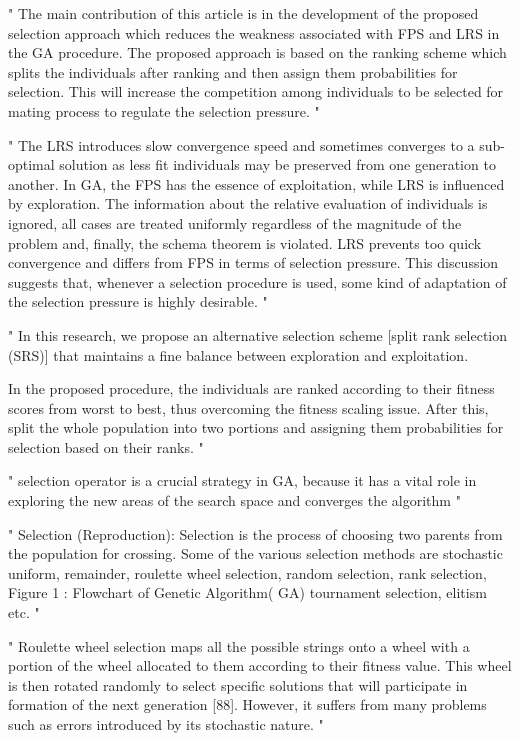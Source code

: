 "
The main contribution of this article is in the development of the proposed selection approach which reduces the weakness associated with FPS and LRS in the GA procedure. The proposed approach is based on the ranking scheme which splits the individuals after ranking and then assign them probabilities for selection. This will increase the competition among individuals to be selected for mating process to regulate the selection pressure.
"\cite{hussain_trade-off_2020}

"
The LRS introduces slow convergence speed and sometimes converges to a sub-optimal solution as less fit individuals may be preserved from one generation to another. In GA, the FPS has the essence of exploitation, while LRS is influenced by exploration. The information about the relative evaluation of individuals is ignored, all cases are treated uniformly regardless of the magnitude of the problem and, finally, the schema theorem is violated. LRS prevents too quick convergence and differs from FPS in terms of selection pressure. This discussion suggests that, whenever a selection procedure is used, some kind of adaptation of the selection pressure is highly desirable.
"\cite{hussain_trade-off_2020}

"
In this research, we propose an alternative selection scheme [split rank selection (SRS)] that maintains a fine balance between exploration and exploitation.

In the proposed procedure, the individuals are ranked according to their fitness scores from worst to best, thus overcoming the fitness scaling issue. After this, split the whole population into two portions and assigning them probabilities for selection based on their ranks.
"\cite{hussain_trade-off_2020}


"
selection operator is a crucial strategy in GA, because it has a vital role in exploring the new areas of the search space and converges the algorithm
"\cite{hussain_trade-off_2020}

"
Selection (Reproduction): Selection is the process of choosing two parents from the population for crossing. Some of the various selection methods are stochastic uniform, remainder, roulette wheel selection, random selection, rank selection, Figure 1 : Flowchart of Genetic Algorithm( GA) tournament selection, elitism etc.
"\cite{majumdar_genetic_2015}



"
Roulette wheel selection maps all the possible strings onto a wheel with a portion of the wheel allocated to them according to their fitness value. This wheel is then rotated randomly to select specific solutions that will participate in formation of the next generation [88]. However, it suffers from many problems such as errors introduced by its stochastic nature.
"\cite{katoch_review_2021}


